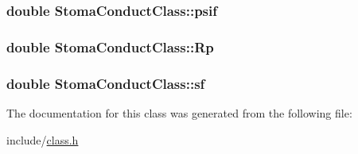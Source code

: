 \subsubsection[{\texorpdfstring{psif}{psif}}]{\setlength{\rightskip}{0pt plus 5cm}double Stoma\+Conduct\+Class\+::psif}\hypertarget{class_stoma_conduct_class_a86fb3d6747c331a4059eef983828667f}{}\label{class_stoma_conduct_class_a86fb3d6747c331a4059eef983828667f}
\subsubsection[{\texorpdfstring{Rp}{Rp}}]{\setlength{\rightskip}{0pt plus 5cm}double Stoma\+Conduct\+Class\+::\+Rp}\hypertarget{class_stoma_conduct_class_a138392559f3fd5a21f08f02d5c4396b4}{}\label{class_stoma_conduct_class_a138392559f3fd5a21f08f02d5c4396b4}
\subsubsection[{\texorpdfstring{sf}{sf}}]{\setlength{\rightskip}{0pt plus 5cm}double Stoma\+Conduct\+Class\+::sf}\hypertarget{class_stoma_conduct_class_a415b93e0d5b967fc2a991ff783f537f3}{}\label{class_stoma_conduct_class_a415b93e0d5b967fc2a991ff783f537f3}


The documentation for this class was generated from the following file\+:\begin{DoxyCompactItemize}
\item 
include/\hyperlink{class_8h}{class.\+h}\end{DoxyCompactItemize}
